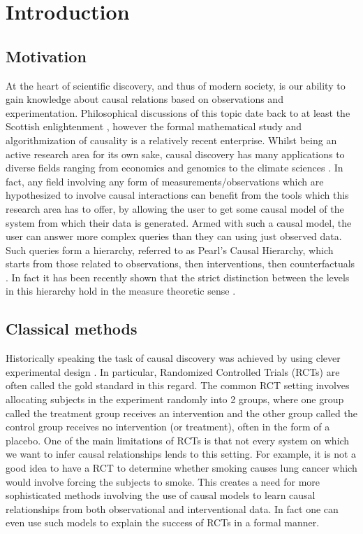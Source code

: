\documentclass{tufte-book}
\begin{document}
\setcounter{tocdepth}{1}
\tableofcontents


\chapter{Introduction}
\label{sec:org1335b94}
\label{sec:Intro}
\section{Motivation}
\label{sec:org8e80295}
At the heart of scientific discovery, and thus of modern society, is our ability to gain knowledge about causal relations based on observations and experimentation. Philosophical discussions of this topic date back to at least the Scottish enlightenment \cite{hume-1748-enquir-concer}, however the formal mathematical study and algorithmization of causality is a relatively recent enterprise. Whilst being an active research area for its own sake, causal discovery has many applications to diverse fields ranging from economics \cite{huenermund-2019-causal-infer} and genomics \cite{hu-2018-applic-causal} to the climate sciences \cite{runge-2019-infer-causat}. In fact, any field involving any form of measurements/observations which are hypothesized to involve causal interactions can benefit from the tools which this research area has to offer, by allowing the user to get some causal model of the system from which their data is generated. Armed with such a causal model, the user can answer more complex queries than they can using just observed data. Such queries form a hierarchy, referred to as Pearl's Causal Hierarchy, which starts from those related to observations, then interventions, then counterfactuals \cite{pearl-2018-book-why}.   In fact it has been recently shown that the strict distinction between the levels in this hierarchy hold in the measure theoretic sense \cite{elias-2020-pearl-hierar}.

\section{Classical methods}
\label{sec:orgb3036f8}
Historically speaking the task of causal discovery was achieved by using clever experimental design \cite{fisher-1935}. In particular, Randomized Controlled Trials (RCTs) are often called the gold standard in this regard. The common RCT setting involves allocating subjects in the experiment randomly into 2 groups, where one group called the treatment group receives an intervention and the other group called the control group receives no intervention (or treatment), often in the form of a placebo. One of the main limitations of RCTs is that not every system on which we want to infer causal relationships lends to this setting. For example, it is not a good idea to have a RCT to determine whether smoking causes lung cancer which would involve forcing the subjects to smoke. This creates a need for more sophisticated methods involving the use of causal models to learn causal relationships from both observational and interventional data. In fact one can even use such models to explain the success of RCTs in a formal manner.
\end{document}
